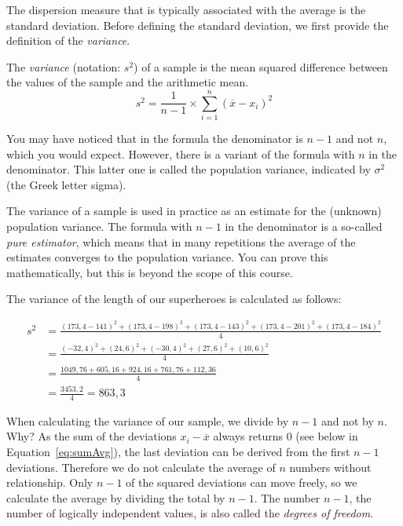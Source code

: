 The dispersion measure that is typically associated with the average is the standard deviation.
Before defining the standard deviation, we first provide the definition of the \emph{variance}.

\begin{definition}[Variance]
    The \emph{variance} (notation: $s^{2}$) of a sample is the mean squared difference between the values of the sample and the arithmetic mean.
    \begin{equation}
    s^{2} = \frac{1}{n-1} \times \sum_{i=1}^{n} \left( \overline{x} - x_i \right)^{2}
    \label{eq:variance}
    \end{equation}
\end{definition}

You may have noticed that in the formula the denominator is $n-1$ and not $n$, which you would expect. However, there is a variant of the formula with $n$ in the denominator. This latter one is called the population variance, indicated by $\sigma^2 $ (the Greek letter sigma).

The variance of a sample is used in practice as an estimate for the (unknown) population variance. The formula with $n-1$ in the denominator is a so-called \textit{pure estimator}, which means that in many repetitions the average of the estimates converges to the population variance. You can prove this mathematically, but this is beyond the scope of this course.

\begin{example}
    The variance of the length of our superheroes is calculated as follows:
    
    \begin{align*}
    s^{2} & =  \frac{(173,4 - 141)^{2} + (173,4 - 198 )^{2} + (173,4 - 143)^{2} + (173,4 - 201)^{2} + (173,4 - 184 )^{2}}{4} \\
    & =  \frac{(-32,4)^{2} + (24,6)^{2} + (-30,4)^{2} + (27,6)^{2} + (10,6)^{2}}{4}                                    \\
    & = \frac{1049,76 + 605,16 + 924,16 + 761,76 + 112,36}{4}                                                          \\
    & = \frac{3453,2}{4} = 863,3
    \end{align*}
\end{example}

When calculating the variance of our sample, we divide by $n-1$ and not by $n$. Why? 
As the sum of the deviations $x_{i} - \overline {x} $ always returns 0 (see below in Equation~\ref{eq:sumAvg}), the last deviation can be derived from the first $n-1$ deviations. Therefore we do not calculate the average of $n$ numbers without relationship. Only $n-1$ of the squared deviations can move freely, so we calculate the average by dividing the total by $n-1$. The number $n-1$, the number of logically independent values, is also called the  \emph{degrees of freedom}.

